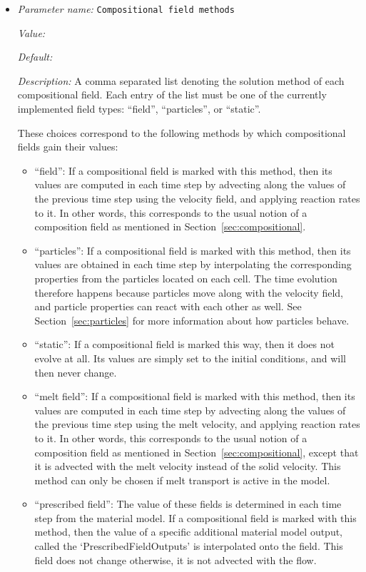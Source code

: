 \begin{itemize}
\item {\it Parameter name:} {\tt Compositional field methods}
\label{parameters:Compositional fields/Compositional field methods}


{\it Value:} 


{\it Default:} 


{\it Description:} A comma separated list denoting the solution method of each compositional field. Each entry of the list must be one of the currently implemented field types: ``field'', ``particles'', or ``static''.

These choices correspond to the following methods by which compositional fields gain their values:\begin{itemize}\item ``field'': If a compositional field is marked with this method, then its values are computed in each time step by advecting along the values of the previous time step using the velocity field, and applying reaction rates to it. In other words, this corresponds to the usual notion of a composition field as mentioned in Section~\ref{sec:compositional}. 
\item ``particles'': If a compositional field is marked with this method, then its values are obtained in each time step by interpolating the corresponding properties from the particles located on each cell. The time evolution therefore happens because particles move along with the velocity field, and particle properties can react with each other as well. See Section~\ref{sec:particles} for more information about how particles behave.
\item ``static'': If a compositional field is marked this way, then it does not evolve at all. Its values are simply set to the initial conditions, and will then never change.
\item ``melt field'': If a compositional field is marked with this method, then its values are computed in each time step by advecting along the values of the previous time step using the melt velocity, and applying reaction rates to it. In other words, this corresponds to the usual notion of a composition field as mentioned in Section~\ref{sec:compositional}, except that it is advected with the melt velocity instead of the solid velocity. This method can only be chosen if melt transport is active in the model.
\item ``prescribed field'': The value of these fields is determined in each time step from the material model. If a compositional field is marked with this method, then the value of a specific additional material model output, called the `PrescribedFieldOutputs' is interpolated onto the field. This field does not change otherwise, it is not advected with the flow.

\end{itemize}
\end{itemize}
